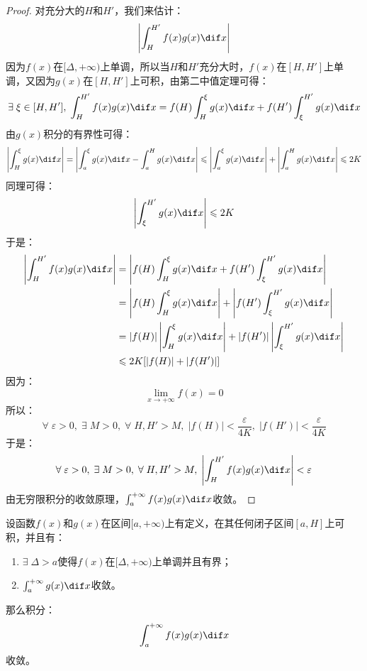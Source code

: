 \begin{proof}
	对充分大的$H$和$H'$，我们来估计：
	\begin{equation*}
		\left|\int_{H}^{H'}f(x)g(x)\dif x\right|
	\end{equation*}
	因为$f(x)$在$[\Delta,+\infty)$上单调，所以当$H$和$H'$充分大时，$f(x)$在$[H,H']$上单调，又因为$g(x)$在$[H,H']$上可积，由第二中值定理可得：
	\begin{equation*}
		\exists\;\xi\in[H,H'],\;\int_{H}^{H'}f(x)g(x)\dif x=f(H)\int_{H}^{\xi}g(x)\dif x+f(H')\int_{\xi}^{H'}g(x)\dif x
	\end{equation*}
	由$g(x)$积分的有界性可得：
	\begin{equation*}
		\left|\int_{H}^{\xi}g(x)\dif x\right|=\left|\int_{a}^{\xi}g(x)\dif x-\int_{a}^{H}g(x)\dif x\right|\leqslant\left|\int_{a}^{\xi}g(x)\dif x\right|+\left|\int_{a}^{H}g(x)\dif x\right|\leqslant2K
	\end{equation*}
	同理可得：
	\begin{equation*}
		\left|\int_{\xi}^{H'}g(x)\dif x\right|\leqslant2K
	\end{equation*}
	于是：
	\begin{align*}
		\left|\int_{H}^{H'}f(x)g(x)\dif x\right|
		&=\left|f(H)\int_{H}^{\xi}g(x)\dif x+f(H')\int_{\xi}^{H'}g(x)\dif x\right| \\
		&=\left|f(H)\int_{H}^{\xi}g(x)\dif x\right|+\left|f(H')\int_{\xi}^{H'}g(x)\dif x\right| \\
		&=|f(H)|\left|\int_{H}^{\xi}g(x)\dif x\right|+|f(H')|\left|\int_{\xi}^{H'}g(x)\dif x\right| \\
		&\leqslant2K[|f(H)|+|f(H')|]
	\end{align*}
	因为：
	\begin{equation*}
		\lim_{x\to+\infty}f(x)=0
	\end{equation*}
	所以：
	\begin{equation*}
		\forall\;\varepsilon>0,\;\exists\;M>0,\;\forall\;H,H'>M,\;|f(H)|<\frac{\varepsilon}{4K},\;|f(H')|<\frac{\varepsilon}{4K}
	\end{equation*}
	于是：
	\begin{equation*}
		\forall\;\varepsilon>0,\;\exists\;M>0,\;\forall\;H,H'>M,\;\left|\int_{H}^{H'}f(x)g(x)\dif x\right|<\varepsilon
	\end{equation*}
	由无穷限积分的收敛原理，$\int_{a}^{+\infty}f(x)g(x)\dif x$收敛。
\end{proof}
\begin{theorem}[Abel判别法]
	设函数$f(x)$和$g(x)$在区间$[a,+\infty)$上有定义，在其任何闭子区间$[a,H]$上可积，并且有：
	\begin{enumerate}
		\item $\exists\;\Delta>a$使得$f(x)$在$[\Delta,+\infty)$上单调并且有界；
		\item $\int_{a}^{+\infty}g(x)\dif x$收敛。
	\end{enumerate}
	那么积分：
	\begin{equation*}
		\int_{a}^{+\infty}f(x)g(x)\dif x
	\end{equation*}
	收敛。
\end{theorem}
